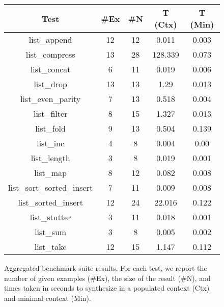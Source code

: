 \newcommand{\maindataCount}{ 43 }
\begin{figure}[t]
  \begin{center}
  \tabcolsep 5.8pt
  \footnotesize
  \begin{tabular}{|c|c|c|c|c|}
  \hline
  \textbf{Test} & \textbf{ \#Ex } &
  \textbf{ \#N } & \textbf{T (Ctx)} & \textbf{T (Min)} \\
  \hline

list\_append & 12 & 12 & 0.011 & 0.003 \\
\hline
list\_compress & 13 & 28 & 128.339 & 0.073 \\
\hline
list\_concat & 6 & 11 & 0.019 & 0.006 \\
\hline
list\_drop & 13 & 13 & 1.29 & 0.013 \\
\hline
list\_even\_parity & 7 & 13 & 0.518 & 0.004 \\
\hline
list\_filter & 8 & 15 & 1.327 & 0.013 \\
\hline
list\_fold & 9 & 13 & 0.504 & 0.139 \\
\hline
list\_inc & 4 & 8 & 0.004 & 0.00 \\
\hline
list\_length & 3 & 8 & 0.019 & 0.001 \\
\hline
list\_map & 8 & 12 & 0.082 & 0.008 \\
\hline
list\_sort\_sorted\_insert & 7 & 11 & 0.009 & 0.008 \\
\hline
list\_sorted\_insert & 12 & 24 & 22.016 & 0.122 \\
\hline
list\_stutter & 3 & 11 & 0.018 & 0.001 \\
\hline
list\_sum & 3 & 8 & 0.005 & 0.002 \\
\hline
list\_take & 12 & 15 & 1.147 & 0.112 \\

  \hline
  \end{tabular}
  \end{center}
  \caption{Aggregated benchmark suite results. For each test, we report the number of given examples (\#Ex), the size
  of the result (\#N), and times taken in seconds to synthesize in a populated context (Ctx) and minimal context (Min).}
  \label{fig:maindata}
  \vspace*{-2.5ex}
\end{figure}
